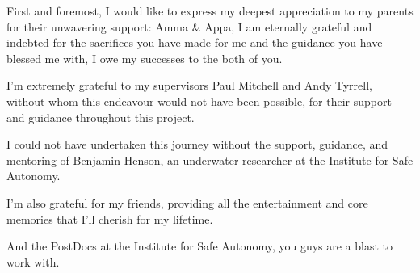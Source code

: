 First and foremost, I would like to express my deepest appreciation to my parents for their unwavering support: Amma \& Appa, I am eternally grateful and indebted for the sacrifices you have made for me and the guidance you have blessed me with, I owe my successes to the both of you.

I'm extremely grateful to my supervisors Paul Mitchell and Andy Tyrrell, without whom this endeavour would not have been possible, for their support and guidance throughout this project. 

I could not have undertaken this journey without the support, guidance, and mentoring of Benjamin Henson, an underwater researcher at the Institute for Safe Autonomy.

I'm also grateful for my friends, providing all the entertainment and core memories that I'll cherish for my lifetime.

And the PostDocs at the Institute for Safe Autonomy, you guys are a blast to work with.
